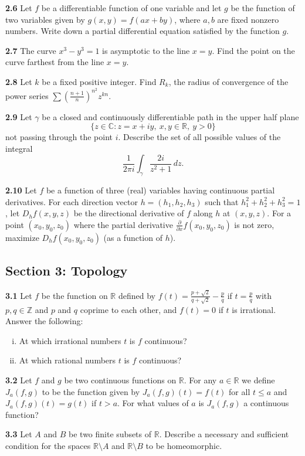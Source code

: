 \documentclass[11pt,a4paper]{article}
\newcommand{\Z}{\mathbb{Z}}
\newcommand{\R}{\mathbb{R}}
\newcommand{\C}{\mathbb{C}}
\newcommand{\examsec}[1]{%
  \subsection*{#1}
  \vspace{-2pt}
}
\newcommand{\qitem}[1]{\par\medskip\noindent\textbf{#1}\hspace{0.5em}}
\begin{document}
\qitem{2.6} Let $f$ be a differentiable function of one variable and let $g$ be the function of two variables given by $g(x, y) = f(ax + by)$, where $a, b$ are fixed nonzero numbers. Write down a partial differential equation satisfied by the function $g$.

\qitem{2.7} The curve $x^3 - y^3 = 1$ is asymptotic to the line $x = y$. Find the point on the curve farthest from the line $x = y$.

\qitem{2.8} Let $k$ be a fixed positive integer. Find $R_k$, the radius of convergence of the power series $\sum \left(\frac{n+1}{n}\right)^{n^2} z^{kn}$.

\qitem{2.9} Let $\gamma$ be a closed and continuously differentiable path in the upper half plane
\[
  \{z \in \C : z = x + iy,\ x, y \in \R,\ y > 0\}
\]
not passing through the point $i$. Describe the set of all possible values of the integral
\[
  \frac{1}{2\pi i} \int_{\gamma} \frac{2i}{z^2 + 1}\,dz.
\]

\qitem{2.10} Let $f$ be a function of three (real) variables having continuous partial derivatives. For each direction vector $h = (h_1, h_2, h_3)$ such that $h_1^2 + h_2^2 + h_3^2 = 1$, let $D_h f(x, y, z)$ be the directional derivative of $f$ along $h$ at $(x, y, z)$. For a point $(x_0, y_0, z_0)$ where the partial derivative $\frac{\partial}{\partial x} f(x_0, y_0, z_0)$ is not zero, maximize $D_h f(x_0, y_0, z_0)$ (as a function of $h$).

\examsec{Section 3: Topology}

\qitem{3.1} Let $f$ be the function on $\R$ defined by $f(t) = \frac{p+\sqrt{2}}{q+\sqrt{2}} - \frac{p}{q}$ if $t = \frac{p}{q}$ with $p, q \in \Z$ and $p$ and $q$ coprime to each other, and $f(t) = 0$ if $t$ is irrational. Answer the following:
\begin{enumerate}[i)]
  \item At which irrational numbers $t$ is $f$ continuous?
  \item At which rational numbers $t$ is $f$ continuous?
\end{enumerate}

\qitem{3.2} Let $f$ and $g$ be two continuous functions on $\R$. For any $a \in \R$ we define $J_a(f, g)$ to be the function given by $J_a(f, g)(t) = f(t)$ for all $t \le a$ and $J_a(f, g)(t) = g(t)$ if $t > a$. For what values of $a$ is $J_a(f, g)$ a continuous function?

\qitem{3.3} Let $A$ and $B$ be two finite subsets of $\R$. Describe a necessary and sufficient condition for the spaces $\R \setminus A$ and $\R \setminus B$ to be homeomorphic.
\end{document}
